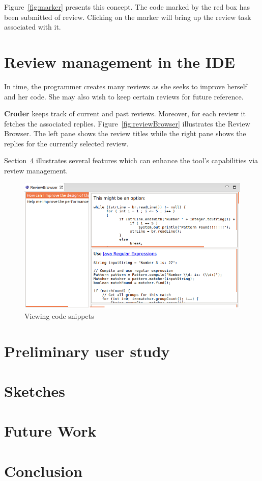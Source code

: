 \documentclass{sigchi}
\newcommand{\croder}{\textbf{Croder }}
\begin{document}
Figure~\ref{fig:marker} presents this concept. The code marked by the red box has been submitted of
review. Clicking on the marker will bring up the review task associated with it.

\section{Review management in the IDE}

In time, the programmer creates many reviews as she seeks to improve herself and her code. She may also wish to keep certain reviews for future reference. 

\croder keeps track of current and past reviews. Moreover, for each review it fetches the associated replies. Figure~\ref{fig:reviewBrowser} illustrates the Review Browser. The left pane shows the review titles while the right pane shows the replies for the currently selected review.

Section~\ref{sec:future} illustrates several features which can enhance the tool's capabilities via review management.

\begin{figure}[hbt]
	\centering
	\includegraphics[scale=0.3]{reviewBrowser.png}
\caption{Viewing code snippets}
\label{fig:snippetViewer}
\end{figure}

\section{Preliminary user study}
\section{Sketches}

\section{Future Work}
\label{sec:future}


\section{Conclusion}



\end{document}
